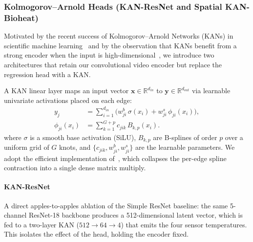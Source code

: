 \subsubsection{Kolmogorov--Arnold Heads (KAN-ResNet and Spatial KAN-Bioheat)}\label{sec:kan_models}

Motivated by the recent success of Kolmogorov--Arnold Networks (KANs) in scientific machine learning~\cite{liu2024kan,wang2024kinn,patra2024pikan} and by the observation that KANs benefit from a strong encoder when the input is high-dimensional~\cite{shen2025alpkan}, we introduce two architectures that retain our convolutional video encoder but replace the regression head with a KAN.

A KAN linear layer maps an input vector $\mathbf{x}\in\mathbb{R}^{d_{in}}$ to $\mathbf{y}\in\mathbb{R}^{d_{out}}$ via learnable univariate activations placed on each edge:
\begin{align}
    y_j &= \sum_{i=1}^{d_{in}} \bigl( w^{b}_{ji}\,\sigma(x_i) + w^{s}_{ji}\, \phi_{ji}(x_i) \bigr), \\
    \phi_{ji}(x_i) &= \sum_{k=1}^{G+p} c_{jik}\, B_{k,p}(x_i).
\end{align}
where $\sigma$ is a smooth base activation (SiLU), $B_{k,p}$ are B-splines of order $p$ over a uniform grid of $G$ knots, and $\{c_{jik}, w^{b}_{ji}, w^{s}_{ji}\}$ are the learnable parameters. 
We adopt the efficient implementation of~\cite{blealtan2024efficientkan}, which collapses the per-edge spline contraction into a single dense matrix multiply.

\paragraph{KAN-ResNet} 
A direct apples-to-apples ablation of the Simple ResNet baseline: the same 5-channel ResNet-18 backbone produces a 512-dimensional latent vector, which is fed to a two-layer KAN ($512 \to 64 \to 4$) that emits the four sensor temperatures. 
This isolates the effect of the head, holding the encoder fixed.

